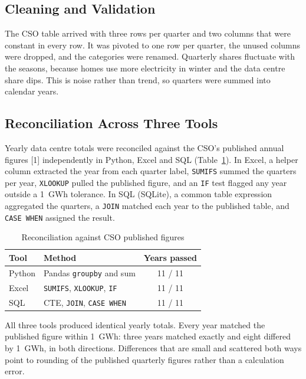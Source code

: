 \documentclass[10pt,twocolumn,a4paper]{article}
\begin{document}
\subsection{Cleaning and Validation}

The CSO table arrived with three rows per quarter and two columns that were constant in every row. It was pivoted to one row per quarter, the unused columns were dropped, and the categories were renamed. Quarterly shares fluctuate with the seasons, because homes use more electricity in winter and the data centre share dips. This is noise rather than trend, so quarters were summed into calendar years.

\subsection{Reconciliation Across Three Tools}

Yearly data centre totals were reconciled against the CSO's published annual figures [1] independently in Python, Excel and SQL (Table~\ref{tab:recon}). In Excel, a helper column extracted the year from each quarter label, \texttt{SUMIFS} summed the quarters per year, \texttt{XLOOKUP} pulled the published figure, and an \texttt{IF} test flagged any year outside a 1~GWh tolerance. In SQL (SQLite), a common table expression aggregated the quarters, a \texttt{JOIN} matched each year to the published table, and \texttt{CASE WHEN} assigned the result.

\begin{table}[h]
\centering
\caption{Reconciliation against CSO published figures}
\label{tab:recon}
\footnotesize
\begin{tabular}{@{}>{\raggedright\arraybackslash}p{1.2cm}>{\raggedright\arraybackslash}p{3.7cm}c@{}}
\toprule
Tool & Method & Years passed \\
\midrule
Python & Pandas \texttt{groupby} and sum & 11 / 11 \\
Excel & \texttt{SUMIFS}, \texttt{XLOOKUP}, \texttt{IF} & 11 / 11 \\
SQL & CTE, \texttt{JOIN}, \texttt{CASE WHEN} & 11 / 11 \\
\bottomrule
\end{tabular}
\end{table}

All three tools produced identical yearly totals. Every year matched the published figure within 1~GWh: three years matched exactly and eight differed by 1~GWh, in both directions. Differences that are small and scattered both ways point to rounding of the published quarterly figures rather than a calculation error.
\end{document}
